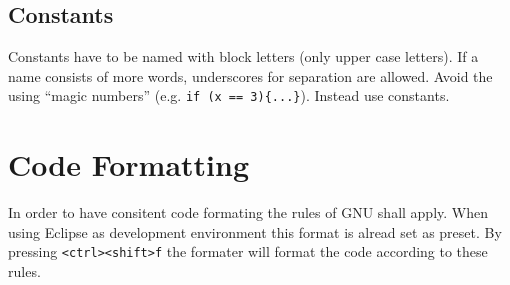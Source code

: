 \documentclass[final,a4paper,10pt, oneside]{article}
\begin{document}
\subsection{Constants}
Constants have to be named with block letters (only upper case letters). If a name consists of more words, underscores for separation are
allowed.  Avoid the using ``magic numbers'' 
(e.g. \verb|if (x == 3){...}|). Instead use constants.


\section{Code Formatting}
In order to have consitent code formating the rules of GNU shall apply. When using Eclipse as development environment this format is alread set as preset. By pressing \verb|<ctrl><shift>f| the formater will format the code according to these rules.
\end{document}

